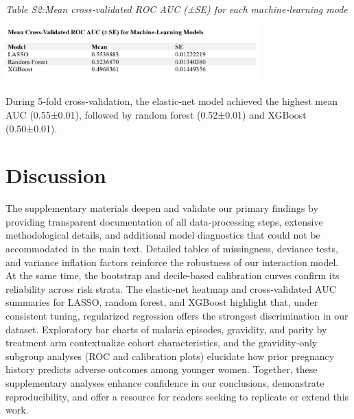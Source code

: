\documentclass[
  letterpaper,
  DIV=11,
  numbers=noendperiod]{scrartcl}
\begin{document}
~ ~

\emph{Table S2:Mean cross‑validated ROC AUC (±SE) for each
machine‑learning mode}

\includegraphics[width=3.88in,height=\textheight,keepaspectratio]{../Images/MeanCV ROC.AUC .png}

During 5‑fold cross‑validation, the elastic‐net model achieved the
highest mean AUC (0.55±0.01), followed by random forest (0.52±0.01) and
XGBoost (0.50±0.01).

\newpage{}

\section{Discussion}\label{discussion}

The supplementary materials deepen and validate our primary findings by
providing transparent documentation of all data‐processing steps,
extensive methodological details, and additional model diagnostics that
could not be accommodated in the main text. Detailed tables of
missingness, deviance tests, and variance inflation factors reinforce
the robustness of our interaction model. At the same time, the bootstrap
and decile‐based calibration curves confirm its reliability across risk
strata. The elastic‐net heatmap and cross‐validated AUC summaries for
LASSO, random forest, and XGBoost highlight that, under consistent
tuning, regularized regression offers the strongest discrimination in
our dataset. Exploratory bar charts of malaria episodes, gravidity, and
parity by treatment arm contextualize cohort characteristics, and the
gravidity‐only subgroup analyses (ROC and calibration plots) elucidate
how prior pregnancy history predicts adverse outcomes among younger
women. Together, these supplementary analyses enhance confidence in our
conclusions, demonstrate reproducibility, and offer a resource for
readers seeking to replicate or extend this work.
\end{document}

